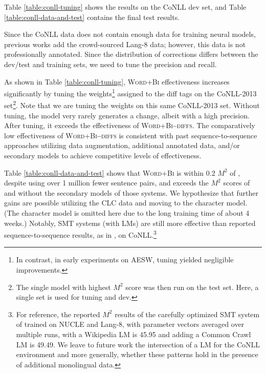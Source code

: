 \documentclass[11pt,letterpaper]{article}
\begin{document}
Table \ref{table:conll-tuning} shows the results on the CoNLL dev set, and Table \ref{table:conll-data-and-test} contains the final test results.

Since the CoNLL data does not contain enough data for training neural models, previous works add the crowd-sourced Lang-8 data; however, this data is not professionally annotated. Since the distribution of corrections differs between the dev/test and training sets, we need to tune the precision and recall.

As shown in Table \ref{table:conll-tuning}, \textsc{Word+Bi} effectiveness increases significantly by tuning the weights\footnote{In contrast, in early experiments on AESW, tuning yielded negligible improvements.} assigned to the diff tags on the CoNLL-2013 set\footnote{The single model with highest $M^2$ score was then run on the test set. Here, a single set is used for tuning and dev.}. Note that we are tuning the weights on this same CoNLL-2013 set. Without tuning, the model very rarely generates a change, albeit with a high precision. After tuning, it exceeds the effectiveness of \textsc{Word+Bi\textbf{--}diffs}. The comparatively low effectiveness of \textsc{Word+Bi\textbf{--}diffs} is consistent with past sequence-to-sequence approaches utilizing data augmentation, additional annotated data, and/or secondary models to achieve competitive levels of effectiveness.

Table \ref{table:conll-data-and-test} shows that \textsc{Word+Bi} is within 0.2 $M^2$ of , despite using over 1 million fewer sentence pairs, and exceeds the $M^2$ scores of  and  without the secondary models of those systems. We hypothesize that further gains are possible utilizing the CLC data and moving to the character model. (The character model is omitted here due to the long training time of about 4 weeks.) Notably, SMT systems (with LMs) are still more effective than reported sequence-to-sequence results, as in , on CoNLL.\footnote{For reference, the reported $M^2$ results of the carefully optimized SMT system of   trained on NUCLE and Lang-8, with parameter vectors averaged over multiple runs, with a Wikipedia LM is 45.95 and adding a Common Crawl LM is 49.49. We leave to future work the intersection of a LM for the CoNLL environment and more generally, whether these patterns hold in the presence of additional monolingual data.}
 
\end{document}
